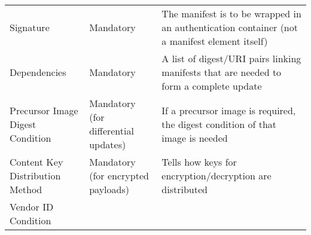\documentclass[0-thesis.tex]{subfiles}
\begin{document}
\begin{longtable}[]{@{}lll@{}}
\begin{minipage}[t]{0.23\columnwidth}
    Signature\strut
    \end{minipage} & \begin{minipage}[t]{0.26\columnwidth}\raggedright\strut
    Mandatory\strut
    \end{minipage} & \begin{minipage}[t]{0.60\columnwidth}\raggedright\strut
    The manifest is to be wrapped in an authentication container (not a
    manifest element itself)\strut
    \end{minipage}\tabularnewline
    \begin{minipage}[t]{0.23\columnwidth}\raggedright\strut
    Dependencies\strut
    \end{minipage} & \begin{minipage}[t]{0.26\columnwidth}\raggedright\strut
    Mandatory\strut
    \end{minipage} & \begin{minipage}[t]{0.60\columnwidth}\raggedright\strut
    A list of digest/URI pairs linking manifests that are needed to form a
    complete update\strut
    \end{minipage}\tabularnewline
    \begin{minipage}[t]{0.23\columnwidth}\raggedright\strut
    Precursor Image Digest Condition\strut
    \end{minipage} & \begin{minipage}[t]{0.26\columnwidth}\raggedright\strut
    Mandatory (for differential updates)\strut
    \end{minipage} & \begin{minipage}[t]{0.60\columnwidth}\raggedright\strut
    If a precursor image is required, the digest condition of that image is needed\strut
    \end{minipage}\tabularnewline
    \begin{minipage}[t]{0.23\columnwidth}\raggedright\strut
    Content Key Distribution Method\strut
    \end{minipage} & \begin{minipage}[t]{0.26\columnwidth}\raggedright\strut
    Mandatory (for encrypted payloads)\strut
    \end{minipage} & \begin{minipage}[t]{0.60\columnwidth}\raggedright\strut
    Tells how keys for encryption/decryption are distributed\strut
    \end{minipage}\tabularnewline
    \begin{minipage}[t]{0.23\columnwidth}\raggedright\strut
    Vendor ID Condition\strut

\end{minipage}
\end{longtable}
\end{document}
